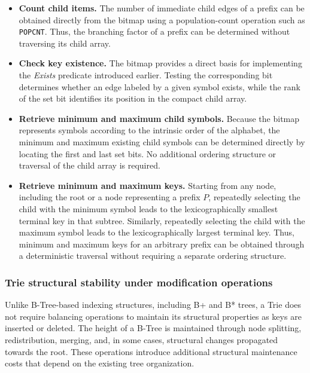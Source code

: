 \documentclass[11pt,twoside]{article}
\begin{document}
    \begin{itemize}
        \item \textbf{Count child items.}
        The number of immediate child edges of a prefix can be obtained directly from the bitmap using a population-count
        operation such as \texttt{POPCNT}. Thus, the branching factor of a prefix can be determined without traversing
        its child array.
        \item \textbf{Check key existence.}
        The bitmap provides a direct basis for implementing the \textit{Exists} predicate introduced earlier.
        Testing the corresponding bit determines whether an edge labeled by a given symbol exists, while the rank of the
        set bit identifies its position in the compact child array.

        \item \textbf{Retrieve minimum and maximum child symbols.}
        Because the bitmap represents symbols according to the intrinsic order of the alphabet, the minimum and maximum
        existing child symbols can be determined directly by locating the first and last set bits. No additional ordering
        structure or traversal of the child array is required.

        \item \textbf{Retrieve minimum and maximum keys.}
        Starting from any node, including the root or a node representing a prefix $P$, repeatedly selecting the child with
        the minimum symbol leads to the lexicographically smallest terminal key in that subtree.
        Similarly, repeatedly selecting the child with the maximum symbol leads to the lexicographically largest terminal key.
        Thus, minimum and maximum keys for an arbitrary prefix can be obtained through a deterministic traversal without
        requiring a separate ordering structure.

    \end{itemize}

    \subsubsection{Trie structural stability under modification operations}

    Unlike B-Tree-based indexing structures, including B+ and B* trees, a Trie does not require balancing
    operations to maintain its structural properties as keys are inserted or deleted. The height of a B-Tree is
    maintained through node splitting, redistribution, merging, and, in some cases, structural changes propagated
    towards the root. These operations introduce additional structural maintenance costs that
    depend on the existing tree organization.
\end{document}
